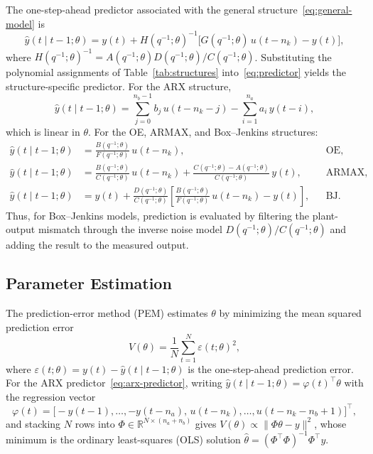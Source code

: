 \documentclass[acmsmall,screen,review]{acmart}
\begin{document}
The one-step-ahead predictor associated with the general
structure~\eqref{eq:general-model} is~\cite{ljung1999}
\begin{equation}
    \hat{y}(t \mid t-1;\theta) =
    y(t) + H(q^{-1};\theta)^{-1}
    \bigl[G(q^{-1};\theta)\,u(t-n_k) - y(t)\bigr],
    \label{eq:predictor}
\end{equation}
where $H(q^{-1};\theta)^{-1} = A(q^{-1};\theta)D(q^{-1};\theta)/C(q^{-1};\theta)$.
Substituting the polynomial assignments of Table~\ref{tab:structures}
into~\eqref{eq:predictor} yields the structure-specific predictor.
For the ARX structure,
\begin{equation}
    \hat{y}(t \mid t-1;\theta) =
    \sum_{j=0}^{n_b-1} b_j\,u(t-n_k-j)
    - \sum_{i=1}^{n_a} a_i\,y(t-i),
    \label{eq:arx-predictor}
\end{equation}
which is linear in $\theta$.
For the OE, ARMAX, and Box--Jenkins structures:
\begin{align}
    \hat{y}(t \mid t-1;\theta) &= \frac{B(q^{-1};\theta)}{F(q^{-1};\theta)}\,u(t-n_k),
    && \text{OE}, \label{eq:oe-predictor}\\
    \hat{y}(t \mid t-1;\theta) &= \frac{B(q^{-1};\theta)}{C(q^{-1};\theta)}\,u(t-n_k)
    + \frac{C(q^{-1};\theta)-A(q^{-1};\theta)}{C(q^{-1};\theta)}\,y(t),
    && \text{ARMAX}, \label{eq:armax-predictor}\\
    \hat{y}(t \mid t-1;\theta) &= y(t)
    + \frac{D(q^{-1};\theta)}{C(q^{-1};\theta)}
    \left[\frac{B(q^{-1};\theta)}{F(q^{-1};\theta)}\,u(t-n_k) - y(t)\right],
    && \text{BJ}. \label{eq:bj-predictor}
\end{align}
Thus, for Box--Jenkins models, prediction is evaluated by filtering the
plant-output mismatch through the inverse noise model $D(q^{-1};\theta)/C(q^{-1};\theta)$
and adding the result to the measured output.

\subsection{Parameter Estimation}
\label{subsec:criterion}

The prediction-error method (PEM) estimates $\theta$ by minimizing
the mean squared prediction error~\cite{ljung1999,soderstrom1989}
\begin{equation}
    V(\theta) = \frac{1}{N}\sum_{t=1}^{N} \varepsilon(t;\theta)^2,
    \label{eq:criterion}
\end{equation}
where $\varepsilon(t;\theta) = y(t) - \hat{y}(t \mid t-1;\theta)$ is the
one-step-ahead prediction error.
For the ARX predictor~\eqref{eq:arx-predictor}, writing
$\hat{y}(t \mid t-1;\theta) = \varphi(t)^\top\theta$ with the regression vector
\begin{equation}
  \varphi(t) = \bigl[-y(t-1),\ldots,-y(t-n_a),\,
                      u(t-n_k),\ldots,u(t-n_k-n_b+1)\bigr]^\top,
  \label{eq:regressor}
\end{equation}
and stacking $N$ rows into $\Phi \in \mathbb{R}^{N \times (n_a+n_b)}$ gives
$V(\theta) \propto \|\Phi\theta - y\|^2$,
whose minimum is the ordinary least-squares (OLS) solution
$\hat{\theta} = (\Phi^\top\Phi)^{-1}\Phi^\top y$.
\end{document}

